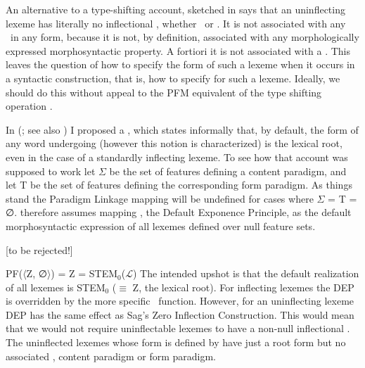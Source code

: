\documentclass[output=paper,colorlinks,citecolor=brown]{langscibook}
\begin{document}
An alternative to a type-shifting account,  sketched in \citet{spencer2019-paper,spencer2019-poster} says that an uninflecting lexeme has literally no inflectional , whether \PC\ or \PF. It is not associated with any \PC\ in any form, because it is not, by definition, associated with any morphologically expressed morphosyntactic property. A fortiori it is not associated with a \PF. This leaves the question of how to specify the form of such a lexeme when it occurs in a syntactic construction, that is, how to specify  for such a lexeme. Ideally, we should do this without appeal to the PFM equivalent of the type shifting operation .

In \citeauthor{spencer2019-paper} (\citeyear{spencer2019-paper,spencer2019-poster}; see also \citealp{spencer2020}) I proposed a , which states informally that, by default, the form of any word undergoing  (however this notion is characterized) is the lexical root, even in the case of a standardly inflecting lexeme. To see how that account was supposed to work let $\Sigma$ be the set of features defining a content paradigm, and let T be the set of features defining the corresponding form paradigm.  %
As things stand  the Paradigm Linkage mapping will be undefined for cases where $\Sigma$ = T = ∅. \citet{spencer2020} therefore assumes mapping , the Default Exponence Principle, as the default morphosyntactic expression of all lexemes defined over null feature sets.

\ea\label{default}  [to be rejected!]

PF($\langle$Z, ∅$\rangle$) = Z = STEM$_{0}$($\mathcal{L}$)
\z
The intended upshot is that the default realization of all lexemes is STEM$_{0}$ ($\equiv$ Z, the lexical root). %
For inflecting lexemes the DEP  is overridden by the more specific \Corr\ function.  However, for an uninflecting lexeme DEP has the same effect as Sag’s Zero Inflection Construction. This would mean that  we would not require uninflectable lexemes to have a non-null inflectional . The uninflected lexemes whose form is defined by  have just a root form but no associated , content paradigm or form paradigm.%
\end{document}
